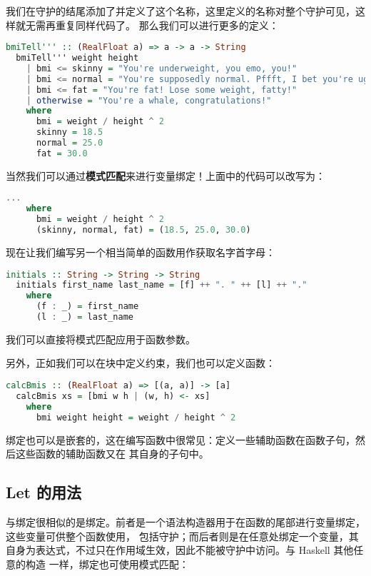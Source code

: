 \documentclass[./main.tex]{subfiles}
\begin{document}
我们在守护的结尾添加了并定义了这个名称，这里定义的名称对整个守护可见，这样就无需再重复同样代码了。
那么我们可以进行更多的定义：

\begin{lstlisting}[language=Haskell]
  bmiTell''' :: (RealFloat a) => a -> a -> String
  bmiTell''' weight height
    | bmi <= skinny = "You're underweight, you emo, you!"
    | bmi <= normal = "You're supposedly normal. Pffft, I bet you're ugly!"
    | bmi <= fat = "You're fat! Lose some weight, fatty!"
    | otherwise = "You're a whale, congratulations!"
    where
      bmi = weight / height ^ 2
      skinny = 18.5
      normal = 25.0
      fat = 30.0
\end{lstlisting}

当然我们可以通过\textbf{模式匹配}来进行变量绑定！上面中的代码可以改写为：

\begin{lstlisting}[language=Haskell]
    ...
    where
      bmi = weight / height ^ 2
      (skinny, normal, fat) = (18.5, 25.0, 30.0)
\end{lstlisting}

现在让我们编写另一个相当简单的函数用作获取名字首字母：

\begin{lstlisting}[language=Haskell]
  initials :: String -> String -> String
  initials first_name last_name = [f] ++ ". " ++ [l] ++ "."
    where
      (f : _) = first_name
      (l : _) = last_name
\end{lstlisting}

我们可以直接将模式匹配应用于函数参数。

另外，正如我们可以在块中定义约束，我们也可以定义函数：

\begin{lstlisting}[language=Haskell]
  calcBmis :: (RealFloat a) => [(a, a)] -> [a]
  calcBmis xs = [bmi w h | (w, h) <- xs]
    where
      bmi weight height = weight / height ^ 2
\end{lstlisting}

绑定也可以是嵌套的，这在编写函数中很常见：定义一些辅助函数在函数子句，然后这些函数的辅助函数又在
其自身的子句中。

\subsection*{Let 的用法}

与绑定很相似的是绑定。前者是一个语法构造器用于在函数的尾部进行变量绑定，这些变量可供整个函数使用，
包括守护；而后者则是在任意处绑定一个变量，其自身为表达式，不过只在作用域生效，因此不能被守护中访问。与 Haskell 其他任意的构造
一样，绑定也可使用模式匹配：
\end{document}
